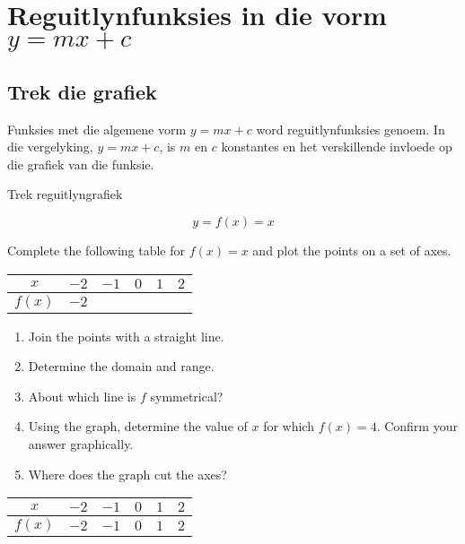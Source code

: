 \section{Reguitlynfunksies in die vorm $y=mx+c$}


\subsection*{Trek die grafiek}       
Funksies met die algemene vorm $y=mx+c$ word reguitlynfunksies genoem. In die vergelyking, $y=mx+c$, is $m$ en $c$ konstantes en het verskillende invloede op die grafiek van die funksie. 
\par
{}

\begin{wex}{Trek reguitlyngrafiek}
{
\begin{equation*}
 y = f(x) = x
\end{equation*}

Complete the following table for $f(x)=x$ and plot the points on a set of axes.
\\
\begin{center}
\begin{tabular}{|c|c|c|c|c|c|}
\hline
  $x$ &  $-2$ & $-1$ & $0$ & $1$ & $2$ 
\\ \hline
 $f(x)$& $-2$ & \phantom{$-2$} & \phantom{$-2$} & \phantom{$-2$} & \phantom{$-2$}
\\ \hline
\end{tabular}
\end{center}
\vspace{10pt}
\begin{enumerate}[noitemsep, label=\textbf{\arabic*}. ] 
 \item Join the points with a straight line.
\item Determine the domain and range.
\item About which line is $f$ symmetrical?
\item Using the graph, determine the value of $x$ for which $f(x) = 4$. Confirm your answer graphically.
\item Where does the graph cut the axes?
\end{enumerate}
}
{

\begin{center}
\begin{tabular}{|c|c|c|c|c|c|}
\hline
  $x$ &  $-2$ & $-1$ & $0$ & $1$ & $2$ 
\\ \hline
 $f(x)$& $-2$ & $-1$ & $0$ & $1$ & $2$ 
\\ \hline
\end{tabular}
\end{center}

}
\end{wex}
